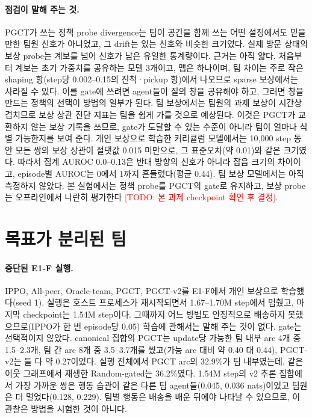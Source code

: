 \documentclass[twocolumn,10pt]{article}
\theoremstyle{remark}
\newcommand{\todo}[1]{\textcolor{red}{[TODO: #1]}}
\newcommand{\ours}{PGCT}
\begin{document}
\paragraph{점검이 말해 주는 것.} \ours{}가 쓰는 정책 probe divergence는 팀이 공간을 함께 쓰는 어떤 설정에서도 믿을 만한 팀원
신호가 아니었고, 그 drift는 있는 신호와 비슷한 크기였다. 실제 방문 상태의 보상 probe는 계보를 넘어 신호가 남은 유일한 통계량이다.
근거는 아직 얇다. 처음부터 계보는 초기 가중치를 공유하는 모델 3개이고, 맵은 하나이며, 팀 차이는 주로 작은 shaping 항(step당
0.002--0.15의 진척·pickup 항)에서 나오므로 sparse 보상에서는 사라질 수 있다. 이를 gate에 쓰려면 agent들이 질의 창을 공유해야 하고,
그러면 창을 만드는 정책의 선택이 방법의 일부가 된다. 팀 보상에서는 팀원의 과제 보상이 시간상 겹치므로 보상 상관 진단 지표는
팀을 쉽게 가를 것으로 예상된다. 이것은 \ours{}가 교환하지 않는 보상 기록을 쓰므로, gate가 도달할 수 있는 수준이 아니라 팀이 얼마나
식별 가능한지를 보여 준다. 개인 보상으로 학습한 커리큘럼 모델에서는 10{,}000 step 동안 모든 쌍의 보상 상관이 절댓값 0.015
미만으로, 그 표준오차(약 0.01)와 같은 크기였다. 따라서 집계 AUROC 0.0--0.13은 반대 방향의 신호가 아니라 잡음 크기의 차이이고,
episode별 AUROC는 0에서 1까지 흔들렸다(평균 0.44). 팀 보상 모델에서는 아직 측정하지 않았다. 본 실험에서는 정책
probe를 \ours{}의 gate로 유지하고, 보상 probe는 오프라인에서 나란히 평가한다 \todo{본 과제 checkpoint 확인 후 결정}.

\section{목표가 분리된 팀}
\label{sec:main}
\paragraph{중단된 E1-F 실행.} IPPO, All-peer, Oracle-team, \ours{}, \ours{}-v2를 E1-F에서 개인 보상으로 학습했다(seed 1).
실행은 호스트 프로세스가 재시작되면서 1.67--1.70M step에서 멈췄고, 마지막 checkpoint는 1.54M step이다. 그때까지 어느 방법도
안정적으로 배송하지 못했으므로(IPPO가 한 번 episode당 0.05) 학습에 관해서는 말해 주는 것이 없다. gate는 선택적이지 않았다.
canonical 집합의 \ours{}는 update당 가능한 팀 내부 arc 4개 중 1.5--2.3개, 팀 간 arc 8개 중 3.5--3.7개를 썼고(가능 arc 대비 약
0.40 대 0.44), \ours{}-v2는 둘 다 약 0.27이었다. 실행 전체에서 \ours{} arc의 32.9\%가 팀 내부였는데, 같은 이웃 그래프에서
재생한 Random-gated는 36.2\%였다. 1.54M step의 v2 추론 집합에서 가장 가까운 쌍은 행동 습관이 같은 다른 팀 agent들(0.045, 0.036
nats)이었고 팀원은 더 멀었다(0.128, 0.229). 팀별 행동은 배송을 배운 뒤에야 나타날 수 있으므로, 이 관찰은 방법을 시험한 것이
아니다.
\end{document}
